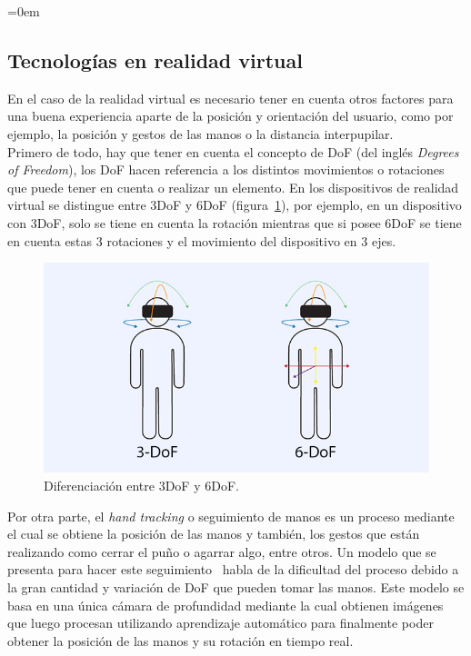 \parindent=0em
\subsection{Tecnologías en realidad virtual}
\noindent

En el caso de la realidad virtual es necesario tener en cuenta otros factores para una buena experiencia aparte de la posición y orientación del usuario, como por ejemplo, la posición y gestos de las manos o la distancia interpupilar.\\

Primero de todo, hay que tener en cuenta el concepto de DoF (del inglés \textit{Degrees of Freedom}), los DoF hacen referencia a los distintos movimientos o rotaciones que puede tener en cuenta o realizar un elemento. En los dispositivos de realidad virtual se distingue entre 3DoF y 6DoF (figura~\ref{fig:3dofvs6dof}), por ejemplo, en un dispositivo con 3DoF, solo se tiene en cuenta la rotación mientras que si posee 6DoF se tiene en cuenta estas 3 rotaciones y el movimiento del dispositivo en 3 ejes.\\

\begin{figure}[H]
    \centering
    \includegraphics[scale=0.6]{Images/Estado del arte/3dofvs6dof.jpg}
    \caption[Diferenciación entre 3DoF y 6DoF]{Diferenciación entre 3DoF y 6DoF\footnotemark.}
    \label{fig:3dofvs6dof}
\end{figure}

Por otra parte, el \textit{hand tracking} o seguimiento de manos es un proceso mediante el cual se obtiene la posición de las manos y también, los gestos que están realizando como cerrar el puño o agarrar algo, entre otros. Un modelo que se presenta para hacer este seguimiento~\cite{robustHandTracking} habla de la dificultad del proceso debido a la gran cantidad y variación de DoF que pueden tomar las manos. Este modelo se basa en una única cámara de profundidad mediante la cual obtienen imágenes que luego procesan utilizando aprendizaje automático para finalmente poder obtener la posición de las manos y su rotación en tiempo real.\\

